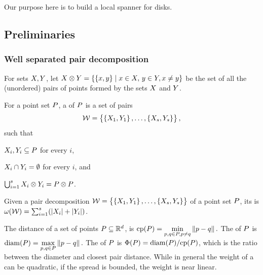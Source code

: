 \documentclass[12pt]{article}%
\begin{document}
Our purpose here is to build a local spanner for disks.

\subsection{Preliminaries}

\subsubsection{Well separated pair decomposition}

For sets $X, Y$, let
\begin{math}
    \PSX \otimes \PSY%
    =%
    \Set{\brc{\px,\py}}{ \px\in \PSX,\, \py\in \PSY, \px \ne \py }
\end{math}
be the set of all the (unordered) pairs of points formed by the sets
$X$ and $Y$.

\begin{defn}
    For a point set $P$, a  of $P$ is a set of pairs
    \begin{equation*}
        \mathcal{W} = \left\{ {\bigl. \left\{ {X_1,Y_1} \right\},\ldots,\left\{ {X_s,Y_s} \right\}} \right\},
    \end{equation*}
    such that
    \begin{enumerate*}[label=(\Roman*)]
        \item $X_i,Y_i\subseteq P$ for every $i$,
        \item $X_i \cap Y_i = \emptyset$ for every $i$, and
        \item
        $\bigcup_{i=1}^s X_i \otimes Y_i = P \otimes P$.
    \end{enumerate*}
\end{defn}

\begin{defn}
    Given a pair decomposition
    $\mathcal{W} = \left\{ {\bigl. \left\{ {X_1,Y_1} \right\},\ldots,\left\{ {X_s,
          Y_s} \right\}} \right\}$ of a point set $P$, its  is
    $\WeightX{\WS} = \sum_{i=1}^s \pth{ \cardin{\PSX_i } +
       \cardin{\PSY_i}}$.
\end{defn}

The  distance of a set of points
$P \subseteq \mathbb{R}^d$, is
\begin{math}
    \cpX{\PS} = \underset{\pa, \pb \in \PS, \pa \neq \pb}{\min}
    \dY{\pa}{\pb}.
\end{math}
The  of $P$ is
\begin{math}
    \diamX{\PS} = \underset{\pa, \pb \in \PS}{\max}\dY{\pa}{\pb}.
\end{math}
The  of $P$ is
$\spreadX{\PS} = \diamX{\PS} / \cpX{\PS}$, which is the ratio between
the diameter and closest pair distance.  While in general the weight
of a \WSPD can be quadratic, if the spread is bounded, the weight is
near linear.
\end{document}
